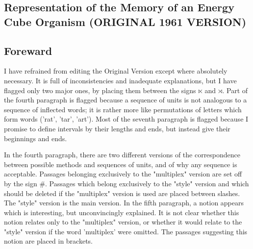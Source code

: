 \documentclass[10pt,twoside]{memoir}
\begin{document}
\begin{enumerate}
{\begin{enumerate}
\begin{sysrules}
\begin{sysrules}
\begin{sysrules}
\begin{sysrules}
{\begin{enumerate}
\chapter{Representation of the Memory of an Energy Cube Organism (ORIGINAL 1961 VERSION)}

\section*{Foreward}

I have refrained from editing the Original Version except where 
absolutely necessary. It is full of inconsistencies and inadequate 
explanations, but I have flagged only two major ones, by placing them 
between the signs $\ltimes$ and $\rtimes$. Part of the fourth paragraph is flagged because a 
sequence of units is not analogous to a sequence of inflected words; it is 
rather more like permutations of letters which form words ('rat', 'tar', 'art'). 
Most of the seventh paragraph is flagged because I promise to define intervals 
by their lengths and ends, but instead give their beginnings and ends. 

In the fourth paragraph, there are two different versions of the 
correspondence between possible methods and sequences of units, and of 
why any sequence is acceptable. Passages belonging exclusively to the 
"multiplex" version are set off by the sign #. Passages which belong 
exclusively to the "style" version and which should be deleted if the 
"multiplex" version is used are placed between slashes. The "style" version is 
the main version. In the fifth paragraph, a notion appears which is 
interesting, but unconvincingly explained. It is not clear whether this notion 
relates only to the "multiplex" version, or whether it would relate to the 
"style" version if the word 'multiplex' were omitted. The passages suggesting 
this notion are placed in brackets. 


\end{enumerate}}
\end{sysrules}
\end{sysrules}
\end{sysrules}
\end{sysrules}
\end{enumerate}}
\end{enumerate}
\end{document}
